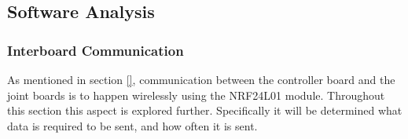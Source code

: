 \subsection{Software Analysis} %
\label{sub:software_analysis}

\subsubsection{Interboard Communication} %
\label{ssub:interboard_communication}
As mentioned in section \ref{}, communication between the controller board and the joint boards is to happen wirelessly using the NRF24L01 module.
Throughout this section this aspect is explored further.
Specifically it will be determined what data is required to be sent, and how often it is sent.
